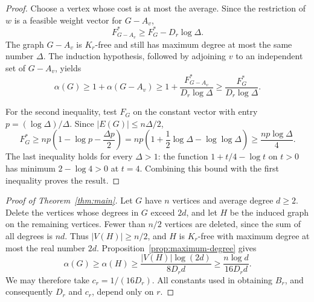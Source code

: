 \documentclass[11pt]{article}
\theoremstyle{definition}
\theoremstyle{remark}
\numberwithin{equation}{section}
\begin{document}
\begin{proof}
Choose a vertex whose cost is at most the average.  Since the restriction
of $w$ is a feasible weight vector for $G-A_v$,
\[
 F_{G-A_v}^*\ge F_G^*-D_r\log\Delta.
\]
The graph $G-A_v$ is $K_r$-free and still has maximum degree at most the
same number $\Delta$.  The induction hypothesis, followed by adjoining
$v$ to an independent set of $G-A_v$, yields
\[
 \alpha(G)\ge 1+\alpha(G-A_v)
 \ge 1+\frac{F_{G-A_v}^*}{D_r\log\Delta}
 \ge \frac{F_G^*}{D_r\log\Delta}.
\]

For the second inequality, test $F_G$ on the constant vector with entry
$p=(\log\Delta)/\Delta$.  Since $|E(G)|\le n\Delta/2$,
\[
 F_G^*\ge np\left(1-\log p-\frac{\Delta p}{2}\right)
 =np\left(1+\frac12\log\Delta-\log\log\Delta\right)
 \ge \frac{np\log\Delta}{4}.
\]
The last inequality holds for every $\Delta>1$: the function
$1+t/4-\log t$ on $t>0$ has minimum $2-\log4>0$ at $t=4$.
Combining this bound with the first inequality proves the result.
\end{proof}

\begin{proof}[Proof of Theorem~\ref{thm:main}]
Let $G$ have $n$ vertices and average degree $d\ge2$.  Delete the vertices
whose degrees in $G$ exceed $2d$, and let $H$ be the induced graph on
the remaining vertices.  Fewer than $n/2$ vertices are deleted, since
the sum of all degrees is $nd$.  Thus $|V(H)|\ge n/2$, and
$H$ is $K_r$-free with maximum degree at most the real number $2d$.
Proposition~\ref{prop:maximum-degree} gives
\[
 \alpha(G)\ge\alpha(H)
 \ge\frac{|V(H)|\log(2d)}{8D_r d}
 \ge\frac{n\log d}{16D_r d}.
\]
We may therefore take $c_r=1/(16D_r)$.
All constants used in obtaining $B_r$, and consequently $D_r$ and $c_r$,
depend only on $r$.
\end{proof}



\end{document}
